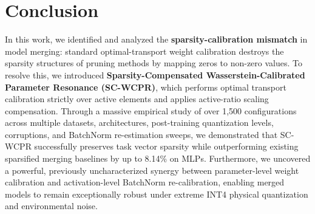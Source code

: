 \documentclass{article}
\theoremstyle{plain}
\theoremstyle{definition}
\theoremstyle{remark}
\begin{document}
\section{Conclusion}
In this work, we identified and analyzed the \textbf{sparsity-calibration mismatch} in model merging: standard optimal-transport weight calibration destroys the sparsity structures of pruning methods by mapping zeros to non-zero values. To resolve this, we introduced \textbf{Sparsity-Compensated Wasserstein-Calibrated Parameter Resonance (SC-WCPR)}, which performs optimal transport calibration strictly over active elements and applies active-ratio scaling compensation. 
Through a massive empirical study of over 1,500 configurations across multiple datasets, architectures, post-training quantization levels, corruptions, and BatchNorm re-estimation sweeps, we demonstrated that SC-WCPR successfully preserves task vector sparsity while outperforming existing sparsified merging baselines by up to 8.14\% on MLPs. 
Furthermore, we uncovered a powerful, previously uncharacterized synergy between parameter-level weight calibration and activation-level BatchNorm re-calibration, enabling merged models to remain exceptionally robust under extreme INT4 physical quantization and environmental noise.



\end{document}
